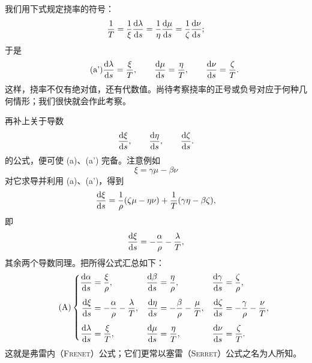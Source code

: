 我们用下式规定挠率的符号：
\[
\frac{1}{T}=\frac{1}{\xi}\frac{\mathrm{d}\lambda}{\mathrm{d} s}=\frac{1}{\eta}\frac{\mathrm{d}\mu}{\mathrm{d} s}=\frac{1}{\zeta}\frac{\mathrm{d}\nu}{\mathrm{d} s};
\]
于是
\begin{equation}\tag{a'}
\frac{\mathrm{d}\lambda}{\mathrm{d} s}=\frac{\xi}{T},\qquad
\frac{\mathrm{d}\mu}{\mathrm{d} s}=\frac{\eta}{T},\qquad
\frac{\mathrm{d}\nu}{\mathrm{d} s}=\frac{\zeta}{T}.
\end{equation}
这样，挠率不仅有绝对值，还有代数值。尚待考察挠率的正号或负号对应于何种几何情形；我们很快就会作此考察。

再补上关于导数
\[
\frac{\mathrm{d}\xi}{\mathrm{d} s},\qquad \frac{\mathrm{d}\eta}{\mathrm{d} s},\qquad \frac{\mathrm{d}\zeta}{\mathrm{d} s}.
\]
的公式，便可使 (a)、(a') 完备。注意例如
\[
\xi=\gamma\mu-\beta\nu
\]
对它求导并利用 (a)、(a')，得到
\[
\frac{\mathrm{d}\xi}{\mathrm{d} s}=\frac{1}{\rho}(\zeta\mu-\eta\nu)+\frac{1}{T}(\gamma\eta-\beta\zeta),
\]
即
\[
\frac{\mathrm{d}\xi}{\mathrm{d} s}=-\frac{\alpha}{\rho}-\frac{\lambda}{T},
\]
其余两个导数同理。把所得公式汇总如下：
\begin{equation}\tag{A}
\left\{
\begin{aligned}
\frac{\mathrm{d}\alpha}{\mathrm{d} s}&=\frac{\xi}{\rho},&
\frac{\mathrm{d}\beta}{\mathrm{d} s}&=\frac{\eta}{\rho},&
\frac{\mathrm{d}\gamma}{\mathrm{d} s}&=\frac{\zeta}{\rho},\\[0.4em]
\frac{\mathrm{d}\xi}{\mathrm{d} s}&=-\frac{\alpha}{\rho}-\frac{\lambda}{T},&
\frac{\mathrm{d}\eta}{\mathrm{d} s}&=-\frac{\beta}{\rho}-\frac{\mu}{T},&
\frac{\mathrm{d}\zeta}{\mathrm{d} s}&=-\frac{\gamma}{\rho}-\frac{\nu}{T},\\[0.4em]
\frac{\mathrm{d}\lambda}{\mathrm{d} s}&=\frac{\xi}{T},&
\frac{\mathrm{d}\mu}{\mathrm{d} s}&=\frac{\eta}{T},&
\frac{\mathrm{d}\nu}{\mathrm{d} s}&=\frac{\zeta}{T}.
\end{aligned}\right.
\end{equation}
这就是\textsc{弗雷内（Frenet）}公式；它们更常以\textsc{塞雷（Serret）}公式之名为人所知。
